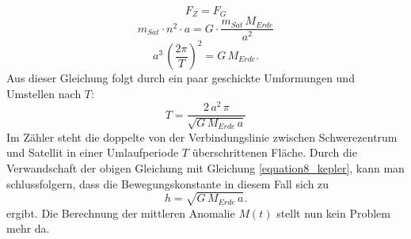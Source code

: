 \begin{equation}
	F_{Z}=F_{G}
\end{equation}     
\begin{equation}
	m_{Sat}\cdot n^2 \cdot a= G \cdot \frac{m_{Sat}\,M_{Erde}}{a^2}
\end{equation} 
\begin{equation}
	 a^3\,\left(\frac{2\pi}{T}\right)^2= G\,M_{Erde}.
\end{equation}     
Aus dieser Gleichung folgt durch ein paar geschickte Umformungen und Umstellen nach \ensuremath{T}:
\begin{equation}
	T=\frac{2\,a^2\,\pi}{\sqrt{G\,M_{Erde}\,a}}
\end{equation}
Im Zähler steht die doppelte von der Verbindungslinie zwischen Schwerezentrum und Satellit in einer Umlaufperiode \ensuremath{T} überschrittenen Fläche. Durch die Verwandschaft der obigen Gleichung mit Gleichung \ref{equation8_kepler}, kann man schlussfolgern, dass die Bewegungskonstante in diesem Fall sich zu 
\begin{equation}
	h=\sqrt{G\,M_{Erde}\,a}.
\end{equation}   
ergibt. Die Berechnung der mittleren Anomalie \ensuremath{M(t)} stellt nun kein Problem mehr da.

